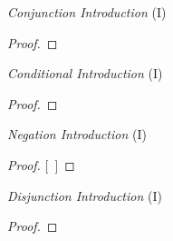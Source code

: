 \vspace{-1em}
				
\iffalse %
\begin{center}
\textit{Reiteration} (R) \vspace{-1em}
\begin{proof}
	\have[m]{a}{\metaA{}}
	\have[\ ]{c}{\metaA{}} \by{R}{a}
\end{proof}
\end{center}
\fi 

\begin{multicols}{2}

\textit{Conjunction Introduction} (\eand I) \vspace{-1em}
\begin{proof}
	 
	 
\end{proof}

\vspace{1em}

\textit{Conditional Introduction} (\eif I) \vspace{-1em}
\begin{proof}
	\open
	\close
\end{proof}

\vspace{0.6em}

\textit{Negation Introduction} (\enot I) \vspace{-1em}
\begin{proof}
\open
	\metaA{}    %
	\metaB{}
\close
{}[\ ]{\enot\metaA{}}
\end{proof}

\vspace{0.6em}

\textit{Disjunction Introduction} (\eor I) \vspace{-1em}

\begin{proof}
\end{proof}

\vspace{0.6em}


\end{multicols}
